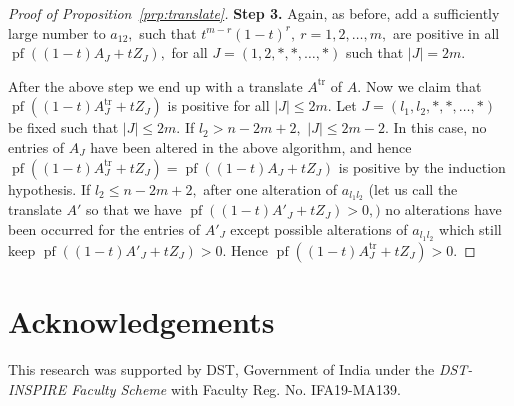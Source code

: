 \documentclass[9pt, BCOR=2mm]{amsart}
\numberwithin{equation}{section}
\numberwithin{equation}{section}
\begin{document}
\begin{proof}[Proof of Proposition~\ref{prp:translate}]
\noindent \textbf{Step 3.}  Again, as before, add a sufficiently large number to $a_{12},$ such that
$t^{m-r}(1-t)^r,~ r=1,2,\dots,m,$ are positive in all $\operatorname{pf}((1-t)A_J+tZ_J),$ for all $J= (1,2,*,*,\dots,*)$ such that 
 $|J|=2m.$    
 
 After the above step we end up with a translate $A^{\mathrm{tr}}$ of $A.$ Now we claim that 
$\operatorname{pf}((1-t)A^{\mathrm{tr}}_J+tZ_J)$ is positive for all $|J|\le2m.$ Let $J=(l_1,l_2,*,*,\dots,*)$ be fixed such that $|J|\le2m.$ If $l_2>n-2m+2,$ $|J|\le2m-2.$ In this case, no entries of $A_J$ have been altered in the above algorithm, and hence  $\operatorname{pf}((1-t)A^{\mathrm{tr}}_J+tZ_J)=\operatorname{pf}((1-t)A_J+tZ_J)$ is positive by the induction hypothesis. If $l_2\le n-2m+2,$ after one alteration of $a_{l_1l_2}$ (let us call the translate $A'$ so that we have $\operatorname{pf}((1-t)A'_J+tZ_J)>0,)$ no alterations have been occurred for the entries of $A'_J$ except possible alterations of  $a_{l_1l_2}$ which still keep $\operatorname{pf}((1-t)A'_J+tZ_J)>0.$ Hence $\operatorname{pf}((1-t)A^{\mathrm{tr}}_J+tZ_J)>0.$             
       
\end{proof} 
 
\section*{Acknowledgements}

This research was  supported by DST, Government of India under the \emph{DST-INSPIRE
Faculty Scheme} with Faculty Reg. No. IFA19-MA139.

\end{document}
